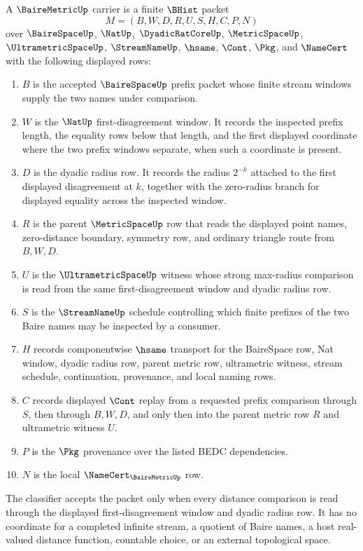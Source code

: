 \begin{definition}
\label{def:bairemetric-prefix-distance-carrier}
A $\BaireMetricUp$ carrier is a finite $\BHist$ packet
$$
M=(B,W,D,R,U,S,H,C,P,N)
$$
over $\BaireSpaceUp$, $\NatUp$, $\DyadicRatCoreUp$, $\MetricSpaceUp$, $\UltrametricSpaceUp$, $\StreamNameUp$, $\hsame$, $\Cont$, $\Pkg$, and $\NameCert$ with the following displayed rows:
\begin{enumerate}
\item $B$ is the accepted $\BaireSpaceUp$ prefix packet whose finite stream windows supply the two names under comparison.
\item $W$ is the $\NatUp$ first-disagreement window. It records the inspected prefix length, the equality rows below that length, and the first displayed coordinate where the two prefix windows separate, when such a coordinate is present.
\item $D$ is the dyadic radius row. It records the radius $2^{-k}$ attached to the first displayed disagreement at $k$, together with the zero-radius branch for displayed equality across the inspected window.
\item $R$ is the parent $\MetricSpaceUp$ row that reads the displayed point names, zero-distance boundary, symmetry row, and ordinary triangle route from $B,W,D$.
\item $U$ is the $\UltrametricSpaceUp$ witness whose strong max-radius comparison is read from the same first-disagreement window and dyadic radius row.
\item $S$ is the $\StreamNameUp$ schedule controlling which finite prefixes of the two Baire names may be inspected by a consumer.
\item $H$ records componentwise $\hsame$ transport for the BaireSpace row, Nat window, dyadic radius row, parent metric row, ultrametric witness, stream schedule, continuation, provenance, and local naming rows.
\item $C$ records displayed $\Cont$ replay from a requested prefix comparison through $S$, then through $B,W,D$, and only then into the parent metric row $R$ and ultrametric witness $U$.
\item $P$ is the $\Pkg$ provenance over the listed BEDC dependencies.
\item $N$ is the local $\NameCert_{\BaireMetricUp}$ row.
\end{enumerate}
The classifier accepts the packet only when every distance comparison is read through the displayed first-disagreement window and dyadic radius row. It has no coordinate for a completed infinite stream, a quotient of Baire names, a host real-valued distance function, countable choice, or an external topological space.
\end{definition}

